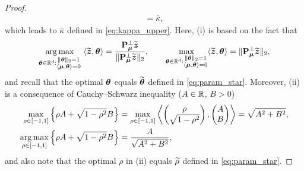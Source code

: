 \begin{proof}
\begin{align}
        = \bar\kappa,
        \nonumber
\end{align}
which leads to $\bar\kappa$ defined in \cref{eq:kappa_upper}. Here, (i) is based on the fact that
\begin{equation}\label{eq:theta_min}
    \operatorname*{arg\,max}_{ {\boldsymbol{\theta}} \in \mathbb{R}^d :  \substack{ \| {\boldsymbol{\theta}} \|_2 = 1 \\ \langle {\boldsymbol{\mu}}, {\boldsymbol{\theta}}  \rangle = 0 } } \ \langle \widetilde{\text{\boldmath $z$}}, {\boldsymbol{\theta}} \rangle = \frac{\mathrm{\bf P}_{{\boldsymbol{\mu}}}^\perp \widetilde{\text{\boldmath $z$}}}{\| \mathrm{\bf P}_{{\boldsymbol{\mu}}}^\perp \widetilde{\text{\boldmath $z$}} \|_2},
    \qquad
    \max_{ {\boldsymbol{\theta}} \in \mathbb{R}^d :  \substack{ \| {\boldsymbol{\theta}} \|_2 = 1 \\ \langle {\boldsymbol{\mu}}, {\boldsymbol{\theta}}  \rangle = 0 } }   \langle \widetilde{\text{\boldmath $z$}}, {\boldsymbol{\theta}} \rangle = \| \mathrm{\bf P}_{{\boldsymbol{\mu}}}^\perp \widetilde{\text{\boldmath $z$}} \|_2,
\end{equation}
and recall that the optimal ${\boldsymbol{\theta}}$ equals $\widetilde{{\boldsymbol{\theta}}}$ defined in \cref{eq:param_star}. Moreover, (ii) is a consequence of Cauchy--Schwarz inequality ($A \in \mathbb{R}$, $B > 0$)
\begin{equation} \label{eq:F_AB_optim}
    \begin{aligned}
        \max_{\rho \in [-1, 1]} \left\{  \rho A + \sqrt{1 - \rho^2} B  \right\}
    & = \max_{\rho \in [-1, 1]} \left\langle \begin{pmatrix}
        \rho \\ \sqrt{1-\rho^2}
    \end{pmatrix}, 
    \begin{pmatrix}
        A \\ B
    \end{pmatrix} \right\rangle = \sqrt{A^2 + B^2}, \\
    \operatorname*{arg\,max}_{\rho \in [-1, 1]} \left\{  \rho A + \sqrt{1 - \rho^2} B \right\}
    & = \frac{A}{\sqrt{A^2 + B^2}},
    \end{aligned}
\end{equation}
and also note that the optimal $\rho$ in (ii) equals $\widetilde\rho$ defined in \cref{eq:param_star}.


\end{proof}

